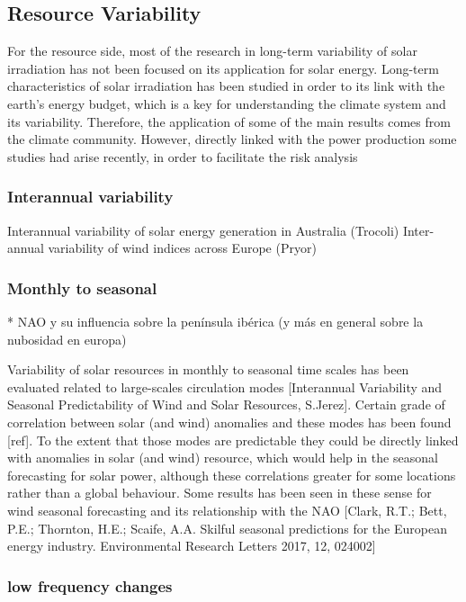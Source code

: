 \subsection{Resource Variability}

For the resource side, most of the research in long-term variability of solar irradiation has not been focused on its application for solar energy. Long-term characteristics of solar irradiation has been studied in order to its link with the earth's energy budget, which is a key for understanding the climate system and its variability. Therefore, the application of some of the main results comes from the climate community. However, directly linked with the power production some studies had arise recently, in order to facilitate the risk analysis


\subsubsection{Interannual variability}

Interannual variability of solar energy generation in Australia (Trocoli)
Inter-annual variability of wind indices across Europe (Pryor)
\subsubsection{Monthly to seasonal}
{\color{red} * NAO y su influencia sobre la península ibérica (y más en general sobre la nubosidad en europa)}

Variability of solar resources in monthly to seasonal time scales has been evaluated related to large-scales circulation modes [Interannual Variability and Seasonal Predictability of Wind and Solar Resources, S.Jerez]. Certain grade of correlation between solar (and wind) anomalies and these modes has been found [ref]. To the extent that those modes are predictable they could be directly linked with anomalies in solar (and wind) resource, which would help in the seasonal forecasting for solar power, although these correlations greater for some locations rather than a global behaviour. Some results has been seen in these sense for wind seasonal forecasting and its relationship with the NAO [Clark, R.T.; Bett, P.E.; Thornton, H.E.; Scaife, A.A. Skilful seasonal predictions for the European energy industry. Environmental Research Letters 2017, 12, 024002]

\subsubsection{low frequency changes}

